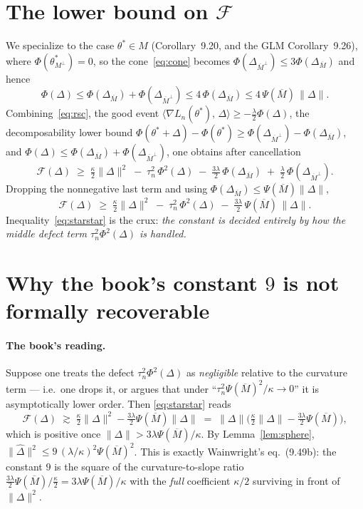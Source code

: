 \documentclass[11pt]{article}
\theoremstyle{definition}
\newcommand{\Ln}{L_n}
\newcommand{\thetast}{\theta^{*}}
\newcommand{\Mbar}{\overline{M}}
\newcommand{\Mperp}{M^{\perp}}
\newcommand{\Mbarperp}{\overline{M}^{\perp}}
\newcommand{\PsM}{\Psi(\Mbar)}
\newcommand{\norm}[1]{\lVert #1 \rVert}
\newcommand{\ip}[2]{\langle #1,\, #2 \rangle}
\newcommand{\Fcal}{\mathcal{F}}
\begin{document}
\section{The lower bound on $\Fcal$}\label{sec:lower}

We specialize to the case $\thetast\in M$ (Corollary~9.20, and the GLM Corollary~9.26), where
$\Phi(\thetast_{\Mperp})=0$, so the cone~\eqref{eq:cone} becomes
$\Phi(\Delta_{\Mbarperp})\le 3\Phi(\Delta_{\Mbar})$ and hence
\begin{equation}\label{eq:Phicone}
  \Phi(\Delta) \le \Phi(\Delta_{\Mbar})+\Phi(\Delta_{\Mbarperp}) \le 4\,\Phi(\Delta_{\Mbar}) \le 4\,\PsM\,\norm{\Delta}.
\end{equation}
Combining~\eqref{eq:rsc}, the good event $\ip{\nabla\Ln(\thetast)}{\Delta}\ge-\tfrac{\lambda}{2}\Phi(\Delta)$,
the decomposability lower bound
$\Phi(\thetast+\Delta)-\Phi(\thetast)\ge\Phi(\Delta_{\Mbarperp})-\Phi(\Delta_{\Mbar})$, and
$\Phi(\Delta)\le\Phi(\Delta_{\Mbar})+\Phi(\Delta_{\Mbarperp})$, one obtains after cancellation
\begin{equation}\label{eq:star}
  \Fcal(\Delta) \;\ge\; \tfrac{\kappa}{2}\norm{\Delta}^2 \;-\; \tau_n^2\,\Phi^2(\Delta)
                 \;-\; \tfrac{3\lambda}{2}\,\Phi(\Delta_{\Mbar})
                 \;+\; \tfrac{\lambda}{2}\,\Phi(\Delta_{\Mbarperp}).
\end{equation}
Dropping the nonnegative last term and using $\Phi(\Delta_{\Mbar})\le\PsM\norm{\Delta}$,
\begin{equation}\label{eq:starstar}
  \boxed{\;\Fcal(\Delta) \;\ge\; \tfrac{\kappa}{2}\norm{\Delta}^2 \;-\; \tau_n^2\,\Phi^2(\Delta)
                 \;-\; \tfrac{3\lambda}{2}\,\PsM\,\norm{\Delta}.\;}
\end{equation}
Inequality~\eqref{eq:starstar} is the crux: \emph{the constant is decided entirely by how the middle
defect term $\tau_n^2\Phi^2(\Delta)$ is handled.}

\section{Why the book's constant $9$ is not formally recoverable}\label{sec:why}

\paragraph{The book's reading.} Suppose one treats the defect $\tau_n^2\Phi^2(\Delta)$ as
\emph{negligible} relative to the curvature term --- i.e.\ one drops it, or argues that under
``$\tau_n^2\PsM^2/\kappa\to0$'' it is asymptotically lower order. Then \eqref{eq:starstar} reads
\[
  \Fcal(\Delta) \;\gtrsim\; \tfrac{\kappa}{2}\norm{\Delta}^2 - \tfrac{3\lambda}{2}\PsM\norm{\Delta}
  \;=\; \norm{\Delta}\Big(\tfrac{\kappa}{2}\norm{\Delta} - \tfrac{3\lambda}{2}\PsM\Big),
\]
which is positive once $\norm{\Delta} > 3\lambda\PsM/\kappa$. By Lemma~\ref{lem:sphere},
$\norm{\widehat\Delta}^2 \le 9\,(\lambda/\kappa)^2\PsM^2$. This is exactly Wainwright's
eq.~(9.49b): the constant $9$ is the square of the curvature-to-slope ratio
$\tfrac{3\lambda}{2}\PsM\big/\tfrac{\kappa}{2}=3\lambda\PsM/\kappa$ with the \emph{full} coefficient
$\kappa/2$ surviving in front of $\norm{\Delta}^2$.
\end{document}
